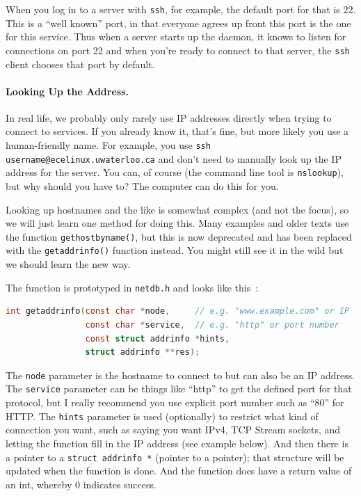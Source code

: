 When you log in to a server with \texttt{ssh}, for example, the default port for that is 22. This is a ``well known'' port, in that everyone agrees up front this port is the one for this service. Thus when a server starts up the daemon, it knows to listen for connections on port 22 and when you're ready to connect to that server, the \texttt{ssh} client chooses that port by default.

\paragraph{Looking Up the Address.}
In real life, we probably only rarely use IP addresses directly when trying to connect to services. If you already know it, that's fine, but more likely you use a human-friendly name. For example, you use \texttt{ssh username@ecelinux.uwaterloo.ca} and don't need to manually look up the IP address for the server. You can, of course (the command line tool is \texttt{nslookup}), but why should you have to? The computer can do this for you.

Looking up hostnames and the like is somewhat complex (and not the focus), so we will just learn one method for doing this. Many examples and older texts use the function \texttt{gethostbyname()}, but this is now deprecated and has been replaced with the \texttt{getaddrinfo()} function instead. You might still see it in the wild but we should learn the new way.

The function is prototyped in \texttt{netdb.h} and looks like this~\cite{getaddrinfo}:
\begin{lstlisting}[language=C]
int getaddrinfo(const char *node,     // e.g. "www.example.com" or IP
                const char *service,  // e.g. "http" or port number
                const struct addrinfo *hints,
                struct addrinfo **res);
\end{lstlisting}

The \texttt{node} parameter is the hostname to connect to but can also be an IP address. The \texttt{service} parameter can be things like ``http'' to get the defined port for that protocol, but I really recommend you use explicit port number such as ``80'' for HTTP. The \texttt{hints} parameter is used (optionally) to restrict what kind of connection you want, such as saying you want IPv4, TCP Stream sockets, and letting the function fill in the IP address (see example below). And then there is a pointer to a \texttt{struct addrinfo *} (pointer to a pointer); that structure will be updated when the function is done. And the function does have a return value of an int, whereby 0 indicates success.

